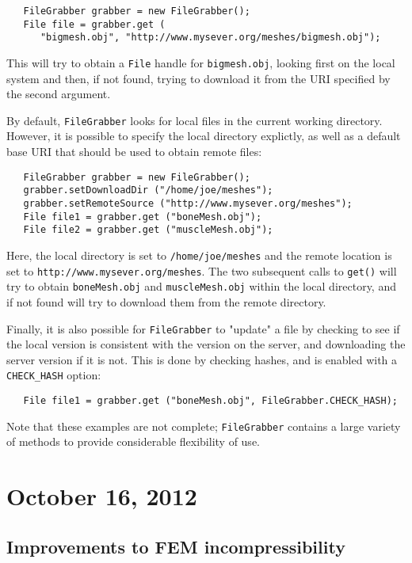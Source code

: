 \documentclass{article}
\begin{document}
\begin{lstlisting}
   FileGrabber grabber = new FileGrabber();
   File file = grabber.get (
      "bigmesh.obj", "http://www.mysever.org/meshes/bigmesh.obj");
\end{lstlisting}
This will try to obtain a {\tt File} handle for {\tt bigmesh.obj},
looking first on the local system and then, if not found, trying to
download it from the URI specified by the second argument.

By default, {\tt FileGrabber} looks for local files in the current
working directory. However, it is possible to specify the local
directory explictly, as well as a default base URI that should be used
to obtain remote files:

\begin{lstlisting}
   FileGrabber grabber = new FileGrabber();
   grabber.setDownloadDir ("/home/joe/meshes");
   grabber.setRemoteSource ("http://www.mysever.org/meshes");
   File file1 = grabber.get ("boneMesh.obj");
   File file2 = grabber.get ("muscleMesh.obj");
\end{lstlisting}
Here, the local directory is set to {\tt /home/joe/meshes}
and the remote location is set
to {\tt http://www.mysever.org/meshes}. The two subsequent
calls to {\tt get()} will try to obtain {\tt boneMesh.obj}
and {\tt muscleMesh.obj} within the local directory,
and if not found will try to download them from the
remote directory.

Finally, it is also possible for {\tt FileGrabber} to "update" a
file by checking to see if the local version is consistent with the
version on the server, and downloading the server version if it is
not. This is done by checking hashes, and is enabled with a 
{\tt CHECK\_HASH} option:
\begin{lstlisting}
   File file1 = grabber.get ("boneMesh.obj", FileGrabber.CHECK_HASH);
\end{lstlisting}

Note that these examples are not complete; {\tt FileGrabber} contains a large
variety of methods to provide considerable flexibility of use.

\section*{October 16, 2012}

\subsection*{Improvements to FEM incompressibility}
\end{document}
